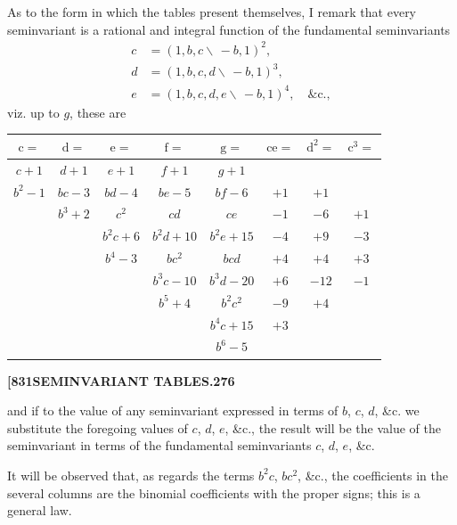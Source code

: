 \documentclass[11pt,a4paper]{book}
\begin{document}
As to the form in which the tables present themselves, I remark that every seminvariant is a rational and integral function of the fundamental seminvariants
\begin{align*}
c &= (1, b, c \!\!\!\backslash\, -b, 1)^2, \\
d &= (1, b, c, d \!\!\!\backslash\, -b, 1)^3, \\
e &= (1, b, c, d, e \!\!\!\backslash\, -b, 1)^4, \quad \&\text{c.},
\end{align*}
viz. up to $g$, these are

\begin{center}
\begin{tabular}{|c|c|c|c|c|c|c|c|}
\hline
$\mathrm{c} =$ & $\mathrm{d} =$ & $\mathrm{e} =$ & $\mathrm{f} =$ & $\mathrm{g} =$ & $\mathrm{ce} =$ & $\mathrm{d}^2 =$ & $\mathrm{c}^3 =$ \\
\hline
$c + 1$ & $d + 1$ & $e + 1$ & $f + 1$ & $g + 1$ & & & \\
$b^2 - 1$ & $bc - 3$ & $bd - 4$ & $be - 5$ & $bf - 6$ & $+1$ & $+1$ & \\
& $b^3 + 2$ & $c^2$ & $cd$ & $ce$ & $-1$ & $-6$ & $+1$ \\
& & $b^2c + 6$ & $b^2d + 10$ & $b^2e + 15$ & $-4$ & $+9$ & $-3$ \\
& & $b^4 - 3$ & $bc^2$ & $bcd$ & $+4$ & $+4$ & $+3$ \\
& & & $b^3c - 10$ & $b^3d - 20$ & $+6$ & $-12$ & $-1$ \\
& & & $b^5 + 4$ & $b^2c^2$ & $-9$ & $+4$ & \\
& & & & $b^4c + 15$ & $+3$ & & \\
& & & & $b^6 - 5$ & & & \\
\hline
\end{tabular}
\end{center}

\newpage
\setcounter{page}{276}

\noindent\textbf{[831}\hfill\textbf{SEMINVARIANT TABLES.}\hfill\textbf{276}

\bigskip

\noindent and if to the value of any seminvariant expressed in terms of $b$, $c$, $d$, \&c. we substitute the foregoing values of $c$, $d$, $e$, \&c., the result will be the value of the seminvariant in terms of the fundamental seminvariants $c$, $d$, $e$, \&c.

It will be observed that, as regards the terms $b^2c$, $bc^2$, \&c., the coefficients in the several columns are the binomial coefficients with the proper signs; this is a general law.
\end{document}
